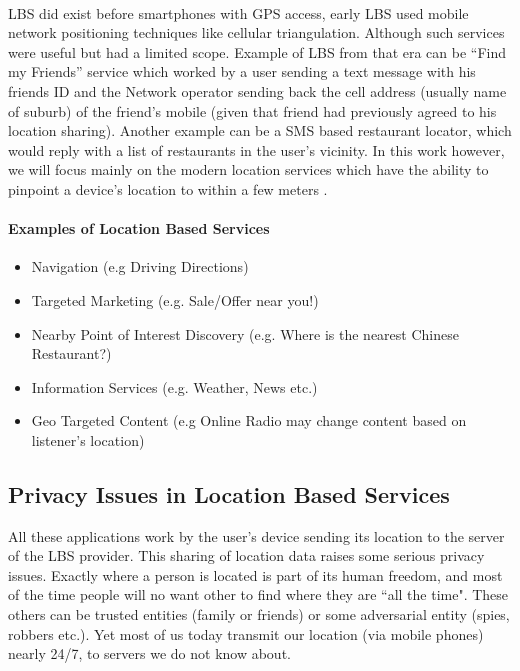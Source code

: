 \documentclass{report}
\begin{document}
\paragraph{}
LBS did exist before smartphones with GPS access, early LBS \cite{lbsShu} used mobile network positioning techniques like cellular triangulation. Although such services were useful but had a limited scope. Example of LBS from that era can be “Find my Friends” service which worked by a user sending a text message with his friends ID and the Network operator sending back the cell address (usually name of suburb) of the friend’s mobile (given that friend had previously agreed to his location sharing). Another example can be a SMS based restaurant locator, which would reply with a list of restaurants in the user’s vicinity. In this work however, we will focus mainly on the modern location services which have the ability to pinpoint a device's location to within a few meters \cite{ TGIS:TGIS1152}.
\paragraph{Examples of Location Based Services}
\begin{itemize}
\item Navigation (e.g Driving Directions)
\item Targeted Marketing (e.g. Sale/Offer near you!)
\item Nearby Point of Interest Discovery (e.g. Where is the nearest Chinese Restaurant?)
\item Information Services (e.g. Weather, News etc.)
\item Geo Targeted Content (e.g Online Radio may change content based on listener's location)
\end{itemize}

\subsection{Privacy Issues in Location Based Services}
All these applications work by the user's device sending its location to the server of the LBS provider. This sharing of location data raises some serious privacy issues. Exactly where a person is located is part of its human freedom, and most of the time people will no want other to find where they are ``all the time". These others can be trusted entities (family or friends) or some adversarial entity (spies, robbers etc.). Yet most of us today transmit our location (via mobile phones) nearly 24/7, to servers we do not know about.
\end{document}
